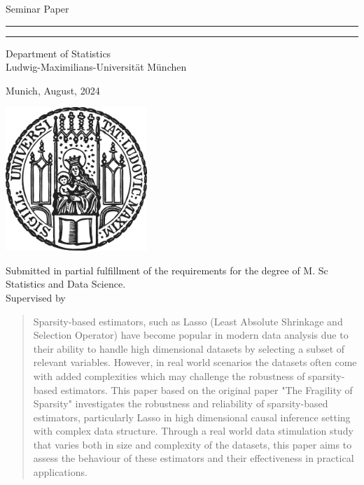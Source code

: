 \begin{titlepage}
\begin{center}
    
\LARGE
Seminar Paper
    
\vspace{0.5cm}
      
\rule{\textwidth}{1.5pt}
\LARGE
\textbf{\mytitle}
\rule{\textwidth}{1.5pt}
   
\vspace{0.5cm}
      
\large
Department of Statistics \\
Ludwig-Maximilians-Universität München 

\vfill

\Large
\textbf{\myname}

\vfill

\large
Munich, August, 2024
      
\vfill

\includegraphics[width = 0.4\textwidth]{sigillum.png}

\vfill

\normalsize
Submitted in partial fulfillment of the requirements for the degree of M. Sc Statistics and Data Science.
\\

Supervised by \mysupervisor

\end{center}
\end{titlepage}


\newpage

\begin{abstract}
Sparsity-based estimators, such as Lasso (Least Absolute Shrinkage and Selection Operator) have become popular in modern data analysis due to their ability to handle high dimensional datasets by selecting a subset of relevant variables. However, in real world scenarios the datasets often come with added complexities which may challenge the robustness of sparsity-based estimators. This paper based on the original paper "The Fragility of Sparsity" investigates the robustness and reliability of sparsity-based estimators, particularly Lasso in high dimensional causal inference setting with complex data structure. Through a real world data stimulation study that varies both in size and complexity of the datasets, this paper aims to assess the behaviour of these estimators and their effectiveness in practical applications. 

\end{abstract}


